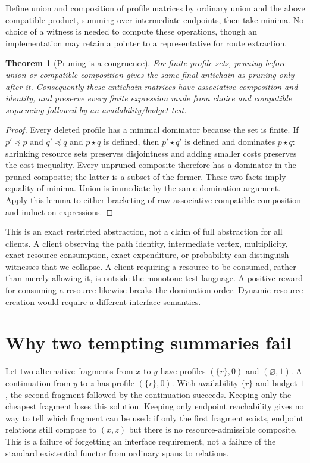 \documentclass[11pt]{article}
\newtheorem{theorem}{Theorem}
\begin{document}
Define union and composition of profile matrices by ordinary union and the above compatible product, summing over intermediate endpoints, then take minima. No choice of a witness is needed to compute these operations, though an implementation may retain a pointer to a representative for route extraction.
\begin{theorem}[Pruning is a congruence]
For finite profile sets, pruning before union or compatible composition gives the same final antichain as pruning only after it. Consequently these antichain matrices have associative composition and identity, and preserve every finite expression made from choice and compatible sequencing followed by an availability/budget test.
\end{theorem}
\begin{proof}
Every deleted profile has a minimal dominator because the set is finite. If $p'\preceq p$ and $q'\preceq q$ and $p\star q$ is defined, then $p'\star q'$ is defined and dominates $p\star q$: shrinking resource sets preserves disjointness and adding smaller costs preserves the cost inequality. Every unpruned composite therefore has a dominator in the pruned composite; the latter is a subset of the former. These two facts imply equality of minima. Union is immediate by the same domination argument. Apply this lemma to either bracketing of raw associative compatible composition and induct on expressions.
\end{proof}

This is an exact restricted abstraction, not a claim of full abstraction for all clients. A client observing the path identity, intermediate vertex, multiplicity, exact resource consumption, exact expenditure, or probability can distinguish witnesses that we collapse. A client requiring a resource to be consumed, rather than merely allowing it, is outside the monotone test language. A positive reward for consuming a resource likewise breaks the domination order. Dynamic resource creation would require a different interface semantics.
\section{Why two tempting summaries fail}
Let two alternative fragments from $x$ to $y$ have profiles $(\{r\},0)$ and $(\varnothing,1)$. A continuation from $y$ to $z$ has profile $(\{r\},0)$. With availability $\{r\}$ and budget $1$, the second fragment followed by the continuation succeeds. Keeping only the cheapest fragment loses this solution. Keeping only endpoint reachability gives no way to tell which fragment can be used: if only the first fragment exists, endpoint relations still compose to $(x,z)$ but there is no resource-admissible composite. This is a failure of forgetting an interface requirement, not a failure of the standard existential functor from ordinary spans to relations.
\end{document}
